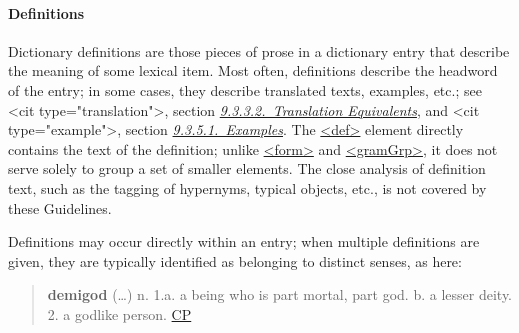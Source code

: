\paragraph[{Definitions}]{Definitions}\label{DITPDE}\par
Dictionary definitions are those pieces of prose in a dictionary entry that describe the meaning of some lexical item. Most often, definitions describe the headword of the entry; in some cases, they describe translated texts, examples, etc.; see <cit type="translation">, section \textit{\hyperref[DITPTR]{9.3.3.2.\ Translation Equivalents}}, and <cit type="example">, section \textit{\hyperref[DITPEG]{9.3.5.1.\ Examples}}. The \hyperref[TEI.def]{<def>} element directly contains the text of the definition; unlike \hyperref[TEI.form]{<form>} and \hyperref[TEI.gramGrp]{<gramGrp>}, it does not serve solely to group a set of smaller elements. The close analysis of definition text, such as the tagging of hypernyms, typical objects, etc., is not covered by these Guidelines.\par
Definitions may occur directly within an entry; when multiple definitions are given, they are typically identified as belonging to distinct senses, as here:
\begin{quote}{\bfseries demigod} (…) n. 1.a. a being who is part mortal, part god. b. a lesser deity. 2. a godlike person. \hyperref[DIC-CP]{CP}\end{quote}
